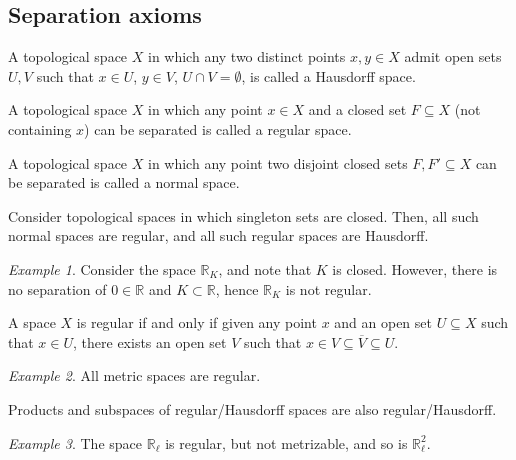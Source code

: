 \documentclass[11pt]{article}
\newcommand{\R}{\mathbb{R}}
\theoremstyle{definition}
\theoremstyle{remark}
\newtheorem*{example}{Example}
\numberwithin{equation}{section}
\begin{document}
    \subsection{Separation axioms}

    \begin{definition}
        A topological space $X$ in which any two distinct points $x, y \in X$ admit
        open sets $U, V$ such that $x \in U$, $y \in V$, $U \cap V = \emptyset$, is
        called a Hausdorff space.
    \end{definition}

    \begin{definition}
        A topological space $X$ in which any point $x \in X$ and a closed set
        $F\subseteq X$ (not containing $x$) can be separated is called a regular
        space.
    \end{definition}
    
    \begin{definition}
        A topological space $X$ in which any point two disjoint closed sets $F, F'
        \subseteq X$ can be separated is called a normal space.
    \end{definition}

    \begin{lemma}
        Consider topological spaces in which singleton sets are closed. Then, all
        such normal spaces are regular, and all such regular spaces are Hausdorff.
    \end{lemma}

    \begin{example}
        Consider the space $\R_K$, and note that $K$ is closed. However, there is no
        separation of $0 \in \R$ and $K \subset \R$, hence $\R_K$ is not regular.
    \end{example}

    \begin{lemma}
        A space $X$ is regular if and only if given any point $x$ and an open set $U
        \subseteq X$ such that $x \in U$, there exists an open set $V$ such that $x
        \in V \subseteq \overline{V} \subseteq U$.
    \end{lemma}
    \begin{example}
        All metric spaces are regular.
    \end{example}

    \begin{lemma}
        Products and subspaces of regular/Hausdorff spaces are also
        regular/Hausdorff.
    \end{lemma}
    \begin{example}
        The space $\R_\ell$ is regular, but not metrizable, and so is $\R_\ell^2$.
    \end{example}
\end{document}
